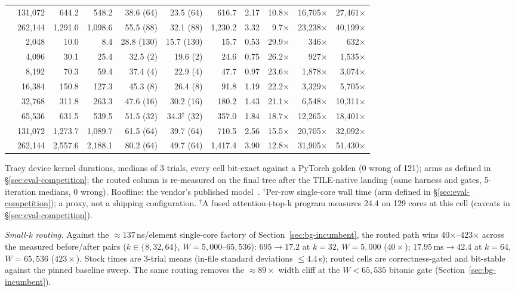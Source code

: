 \begin{table}[t]
\begin{tabular}{@{}rrrrrrrrrrr@{}}
 & 131,072 & 644.2 & 548.2 & 38.6 (64) & 23.5 (64) & 616.7 & 2.17 & 10.8$\times$ & 16,705$\times$ & 27,461$\times$ \\
 & 262,144 & 1,291.0 & 1,098.6 & 55.5 (88) & 32.1 (88) & 1,230.2 & 3.32 & 9.7$\times$ & 23,238$\times$ & 40,199$\times$ \\
\addlinespace
2048 & 2,048 & 10.0 & 8.4 & 28.8 (130) & 15.7 (130) & 15.7 & 0.53 & 29.9$\times$ & 346$\times$ & 632$\times$ \\
 & 4,096 & 30.1 & 25.4 & 32.5 (2) & 19.6 (2) & 24.6 & 0.75 & 26.2$\times$ & 927$\times$ & 1,535$\times$ \\
 & 8,192 & 70.3 & 59.4 & 37.4 (4) & 22.9 (4) & 47.7 & 0.97 & 23.6$\times$ & 1,878$\times$ & 3,074$\times$ \\
 & 16,384 & 150.8 & 127.3 & 45.3 (8) & 26.4 (8) & 91.8 & 1.19 & 22.2$\times$ & 3,329$\times$ & 5,705$\times$ \\
 & 32,768 & 311.8 & 263.3 & 47.6 (16) & 30.2 (16) & 180.2 & 1.43 & 21.1$\times$ & 6,548$\times$ & 10,311$\times$ \\
 & 65,536 & 631.5 & 539.5 & 51.5 (32) & 34.3$^{\ddagger}$ (32) & 357.0 & 1.84 & 18.7$\times$ & 12,265$\times$ & 18,401$\times$ \\
 & 131,072 & 1,273.7 & 1,089.7 & 61.5 (64) & 39.7 (64) & 710.5 & 2.56 & 15.5$\times$ & 20,705$\times$ & 32,092$\times$ \\
 & 262,144 & 2,557.6 & 2,188.1 & 80.2 (64) & 49.7 (64) & 1,417.4 & 3.90 & 12.8$\times$ & 31,905$\times$ & 51,430$\times$ \\
\bottomrule
\end{tabular}

\smallskip
\raggedright\scriptsize
Tracy device kernel durations, medians of 3 trials, every cell bit-exact
against a PyTorch golden (0 wrong of 121); arms as defined in
\S\ref{sec:eval-competition}; the routed column is re-measured on the
final tree after the TILE-native landing (same harness and gates,
5-iteration medians, 0 wrong). Roofline: the vendor's published
model~\cite{ttllmperf2026}. $^{\dagger}$Per-row single-core wall time
(arm defined in \S\ref{sec:eval-competition}); a proxy, not a shipping
configuration. $^{\ddagger}$A fused
attention+top-k program measures 24.4\us{} on 129 cores at this cell
(caveats in \S\ref{sec:eval-competition}).
\end{table}

\emph{Small-k routing.} Against the ${\approx}137$\,ns/element
single-core factory of Section~\ref{sec:bg-incumbent}, the routed path
wins 40$\times$--423$\times$ across the measured before/after pairs
($k \in \{8, 32, 64\}$, $W = 5{,}000$--$65{,}536$): $695\to17.2$\us{} at
$k{=}32$, $W{=}5{,}000$ ($40\times$); $17.95\,\text{ms}\to42.4$\us{} at
$k{=}64$, $W{=}65{,}536$ ($423\times$). Stock times are 3-trial means
(in-file standard deviations $\leq 4.4$\,\textmu s); routed cells are
correctness-gated and bit-stable against the pinned baseline sweep. The same routing removes the ${\approx}89\times$
width cliff at the $W < 65{,}535$ bitonic gate
(Section~\ref{sec:bg-incumbent}).

